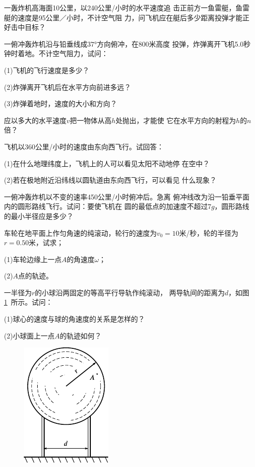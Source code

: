 \begin{exercises}
\exercise 一轰炸机高海面10公里，以240公里/小时的水平速度追
击正前方一鱼雷艇，鱼雷艇的速度是95公里／小时，不计空气阻
力，问飞机应在艇后多少距离投弹才能正好击中目标？

\exercise 一俯冲轰炸机沿与铅垂线成$\ang{37;;}$方向俯冲，在800米高度
投弹，炸弹离开飞机5.0秒钟时着地。不计空气阻力，试问：

(1)飞机的飞行速度是多少？

(2)炸弹离开飞机后在水平方向前进多远？

(3)炸弹着地时，速度的大小和方向？

\exercise 应以多大的水平速度$v$把一物体从高$h$处抛出，才能使
它在水平方向的射程为$h$的$n$倍？

\exercise 飞机以360公里/小时的速度由东向西飞行。试回答：

(1)在什么地理纬度上，飞机上的人可以看见太阳不动地停
在空中？

(2)若在极地附近沿纬线以圆轨道由东向西飞行，可以看见
什么现象？

\exercise 一俯冲轰炸机以不变的速率450公里/小时俯冲后。急离
俯冲线改为沿一铅垂平面内的圆形路线飞行。试问：要使飞机在
圆的最低点的加速度不超过$7g$，圆形路线的最小半径应是多少？

\exercise 车轮在地平面上作匀角速的纯滚动，轮行的速度为$v_0=
  10$米/秒，轮的半径为$r=0.50$米，试求；

(1)车轮边缘上一点$A$的角速度$\omega$；

(2)$A$点的轨迹。

\exercise 一半径为$r$的小球沿两固定的等高平行导轨作纯滚动，
两导轨间的距离为$d$，如图\ref{fig:01.32}~所示。试问：

(1)球心的速度与球的角速度的关系是怎样的？

(2)小球面上一点$A$的轨迹如何？
\begin{figure}[h]
  \begin{center}
    \includegraphics{figure/fig01.32}
    \caption{}
    \label{fig:01.32}
  \end{center}
\end{figure}

\end{exercises}